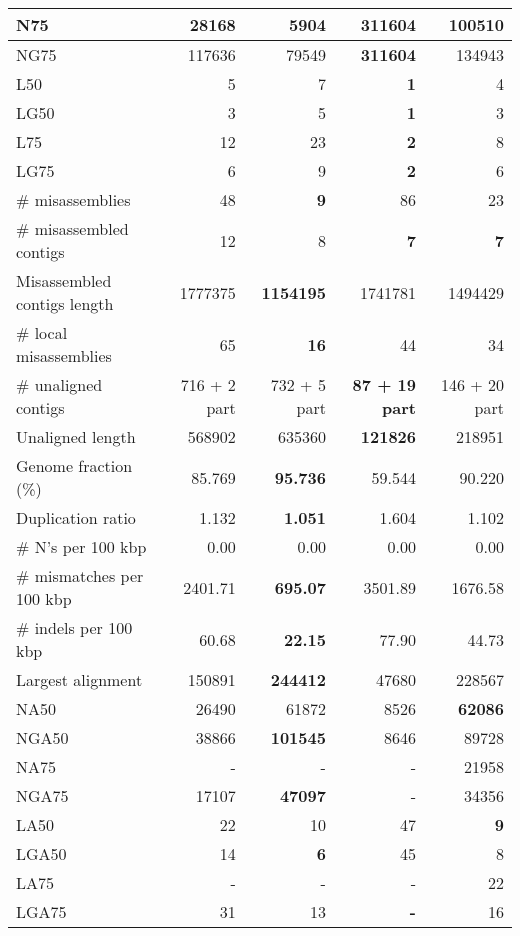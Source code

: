 \documentclass[12pt,a4paper]{article}
\begin{document}
\begin{table}[ht]
\begin{center}
\begin{tabular}{|l*{4}{|r}|}
N75 & 28168 & 5904 & {\bf 311604} & 100510 \\ \hline
NG75 & 117636 & 79549 & {\bf 311604} & 134943 \\ \hline
L50 & 5 & 7 & {\bf 1} & 4 \\ \hline
LG50 & 3 & 5 & {\bf 1} & 3 \\ \hline
L75 & 12 & 23 & {\bf 2} & 8 \\ \hline
LG75 & 6 & 9 & {\bf 2} & 6 \\ \hline
\# misassemblies & 48 & {\bf 9} & 86 & 23 \\ \hline
\# misassembled contigs & 12 & 8 & {\bf 7} & {\bf 7} \\ \hline
Misassembled contigs length & 1777375 & {\bf 1154195} & 1741781 & 1494429 \\ \hline
\# local misassemblies & 65 & {\bf 16} & 44 & 34 \\ \hline
\# unaligned contigs & 716 + 2 part & 732 + 5 part & {\bf 87 + 19 part} & 146 + 20 part \\ \hline
Unaligned length & 568902 & 635360 & {\bf 121826} & 218951 \\ \hline
Genome fraction (\%) & 85.769 & {\bf 95.736} & 59.544 & 90.220 \\ \hline
Duplication ratio & 1.132 & {\bf 1.051} & 1.604 & 1.102 \\ \hline
\# N's per 100 kbp & 0.00 & 0.00 & 0.00 & 0.00 \\ \hline
\# mismatches per 100 kbp & 2401.71 & {\bf 695.07} & 3501.89 & 1676.58 \\ \hline
\# indels per 100 kbp & 60.68 & {\bf 22.15} & 77.90 & 44.73 \\ \hline
Largest alignment & 150891 & {\bf 244412} & 47680 & 228567 \\ \hline
NA50 & 26490 & 61872 & 8526 & {\bf 62086} \\ \hline
NGA50 & 38866 & {\bf 101545} & 8646 & 89728 \\ \hline
NA75 & - & - & - & 21958 \\ \hline
NGA75 & 17107 & {\bf 47097} & - & 34356 \\ \hline
LA50 & 22 & 10 & 47 & {\bf 9} \\ \hline
LGA50 & 14 & {\bf 6} & 45 & 8 \\ \hline
LA75 & - & - & - & 22 \\ \hline
LGA75 & 31 & 13 & {\bf -} & 16 \\ \hline
\end{tabular}
\end{center}
\end{table}
\end{document}
